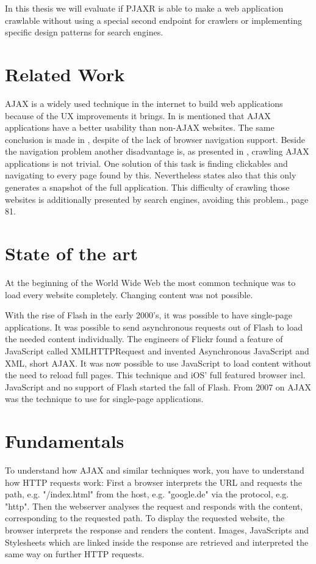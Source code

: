 \documentclass[f,bachelor,binding,twoside,palatino]{WeSTthesis}
\def \ajax {AJAX}
\def \pjaxr {PJAXR}
\def \httpRequest {HTTP request}
\def \singlePageApplication {single-page application}
\begin{document}
    In this thesis we will evaluate if \pjaxr{} is able to make a web application crawlable without using a special second endpoint for crawlers or implementing specific design patterns for search engines.


\section{Related Work}
  \ajax{} is a widely used technique in the internet to build web applications because of the UX improvements it brings.
  In \cite{roodt06} is mentioned that \ajax{} applications have a better usability than non-\ajax{} websites.
  The same conclusion is made in \cite{klugeKarglWeber07}, despite of the lack of browser navigation support.
  Beside the navigation problem another disadvantage is, as presented in \cite{mesbah09}, crawling \ajax{} applications is not trivial.
  One solution of this task is finding clickables and navigating to every page found by this.
  Nevertheless \cite{mesbah09} states also that this only generates a snapshot of the full application.
  This difficulty of crawling those websites is additionally presented by search engines, avoiding this problem.\cite{matter08}, page 81.



\section{State of the art}
  At the beginning of the World Wide Web the most common technique was to load every website completely. Changing content was not possible.
    
  With the rise of Flash in the early 2000's, it was possible to have \singlePageApplication{}s. It was possible to send asynchronous requests out of Flash to load the needed content individually.
  The engineers of Flickr found a feature of JavaScript called XMLHTTPRequest and invented Asynchronous JavaScript and XML, short \ajax{}. It was now possible to use JavaScript to load content without the need to reload full pages.
  This technique and iOS' full featured browser incl. JavaScript and no support of Flash started the fall of Flash. From 2007 on \ajax{} was the technique to use for \singlePageApplication{}s.
  
\section{Fundamentals}
  To understand how \ajax{} and similar techniques work, you have to understand how \httpRequest{}s work:
  First a browser interprets the URL and requests the path, e.g. "/index.html" from the host, e.g. "google.de" via the protocol, e.g. "http".
  Then the webserver analyses the request and responds with the content, corresponding to the requested path.
  To display the requested website, the browser interprets the response and renders the content. 
  Images, JavaScripts and Stylesheets which are linked inside the response are retrieved and interpreted the same way on further \httpRequest{}s.
\end{document}
